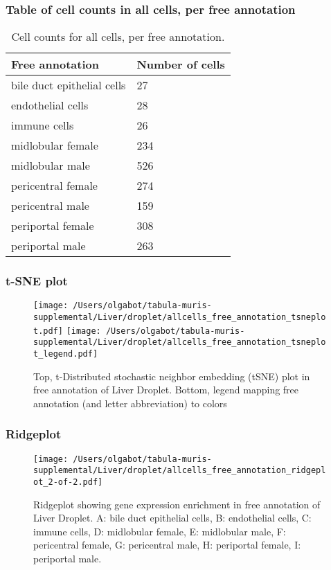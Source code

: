 \subsubsection{Table of cell counts in all cells, per free annotation}\begin{table}[h]
\centering
\label{my-label}
\begin{tabular}{@{}ll@{}}
\toprule

Free annotation& Number of cells \\ \midrule
bile duct epithelial cells & 27 \\

endothelial cells & 28 \\

immune cells & 26 \\

midlobular female & 234 \\

midlobular male & 526 \\

pericentral female & 274 \\

pericentral male & 159 \\

periportal female & 308 \\

periportal male & 263 \\
\bottomrule
\end{tabular}
\caption{Cell counts for all cells, per free annotation.}
\end{table}

\newpage
\subsubsection{t-SNE plot}
\begin{figure}[h]
\centering
\texttt{[image: /Users/olgabot/tabula-muris-supplemental/Liver/droplet/allcells\_free\_annotation\_tsneplot.pdf]}
\texttt{[image: /Users/olgabot/tabula-muris-supplemental/Liver/droplet/allcells\_free\_annotation\_tsneplot\_legend.pdf]}
\caption{Top, t-Distributed stochastic neighbor embedding (tSNE) plot  in free annotation of Liver Droplet. Bottom, legend mapping free annotation (and letter abbreviation) to colors}
\end{figure}


\newpage
\newpage
\subsubsection{Ridgeplot}
\begin{figure}[h]
\centering
\texttt{[image: /Users/olgabot/tabula-muris-supplemental/Liver/droplet/allcells\_free\_annotation\_ridgeplot\_2-of-2.pdf]}

\caption{ Ridgeplot  showing gene expression enrichment in free annotation of Liver Droplet. A: bile duct epithelial cells, B: endothelial cells, C: immune cells, D: midlobular female, E: midlobular male, F: pericentral female, G: pericentral male, H: periportal female, I: periportal male.}
\end{figure}


